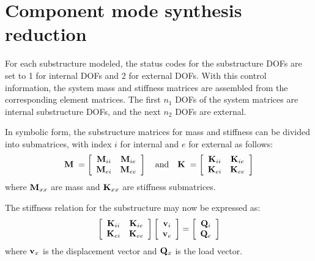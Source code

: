%
%

%
%

\section{Component mode synthesis reduction}
\label{sec:CMS reduction}

For each substructure modeled, the status codes for the substructure DOFs are set to 1 for
internal DOFs and 2 for external DOFs. With this control information, the system mass and stiffness
matrices are assembled from the corresponding element matrices. The first $n_1$ DOFs of the
system matrices are internal substructure DOFs, and the next $n_2$ DOFs are external.

In symbolic form, the substructure matrices for mass and stiffness can be divided into submatrices,
with index $i$ for internal and $e$ for external as follows:
%
\begin{equation}
{\bf M} \;=
\left[\begin{array}{cc}
{\bf M}_{ii} & {\bf M}_{ie} \\
{\bf M}_{ei} & {\bf M}_{ee} \\
\end{array} \right]
\quad\text{and}\quad
{\bf K} \;=
\left[\begin{array}{cc}
{\bf K}_{ii} & {\bf K}_{ie} \\
{\bf K}_{ei} & {\bf K}_{ee} \\
\end{array} \right]
\end{equation}
%
where ${\bf M}_{xx}$ are mass and ${\bf K}_{xx}$ are stiffness submatrices.

The stiffness relation for the substructure may now be expressed as:
%
\begin{equation}
\left[\begin{array}{cc}
{\bf K}_{ii} & {\bf K}_{ie} \\
{\bf K}_{ei} & {\bf K}_{ee} \\
\end{array}\right] \left[\begin{array}{cc}
{\bf v}_i \\
{\bf v}_e \\
\end{array}\right] = \left[\begin{array}{cc}
{\bf Q}_i \\
{\bf Q}_e \\
\end{array}\right]
\label{eqCMS:41}
\end{equation}
%
where ${\bf v}_x$ is the displacement vector and ${\bf Q}_x$ is the load vector.

